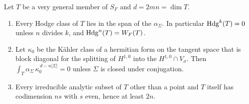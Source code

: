 \begin{lemma}
\label{lem:cmweiltori}
Let $T$ be a very general member of $S_{F}$ and $d=2mn=\dim T$.
\begin{enumerate}[label=\textup{(\roman*)},leftmargin=2.6em,itemsep=2pt]
\item Every Hodge class of $T$ lies in the span of the $\alpha_{\Sigma}$. In
  particular $\mathrm{Hdg}^{k}(T)=0$ unless $n$ divides $k$, and
  $\mathrm{Hdg}^{n}(T)=W_{F}(T)$.
\item Let $\kappa_{0}$ be the K\"ahler class of a hermitian form on the
  tangent space that is block diagonal for the splitting of $H^{1,0}$ into
  the $H^{1,0}\cap V_{\sigma}$. Then $\int_{T}\alpha_{\Sigma}\,
  \kappa_{0}^{\,d-n|\Sigma|}=0$ unless $\Sigma$ is closed under conjugation.
\item Every irreducible analytic subset of $T$ other than a point and $T$
  itself has codimension $ns$ with $s$ even, hence at least $2n$.
\end{enumerate}
\end{lemma}

